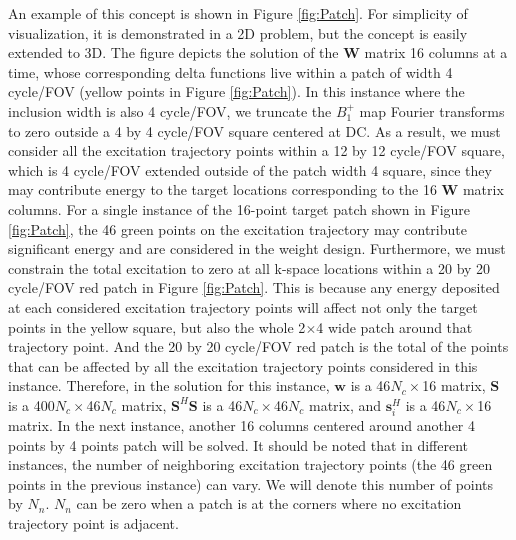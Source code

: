 An example of this concept is shown in Figure \ref{fig:Patch}. For simplicity of visualization, it is demonstrated in a 2D problem, but the concept is easily extended to 3D. The figure depicts the solution of the $\bm{W}$ matrix 16 columns at a time, whose corresponding delta functions live within a patch of width 4 cycle/FOV (yellow points in Figure \ref{fig:Patch}). In this instance where the inclusion width is also 4 cycle/FOV, we truncate the $B_1^+$ map Fourier transforms to zero outside a 4 by 4 cycle/FOV square centered at DC. As a result, we must consider all the excitation trajectory points within a 12 by 12 cycle/FOV square, which is 4 cycle/FOV extended outside of the patch width 4 square, since they may contribute energy to the target locations corresponding to the 16 $\bm{W}$ matrix columns. For a single instance of the 16-point target patch shown in Figure \ref{fig:Patch}, the 46 green points on the excitation trajectory may contribute significant energy and are considered in the weight design. Furthermore, we must constrain the total excitation to zero at all k-space locations within a 20 by 20 cycle/FOV red patch in Figure \ref{fig:Patch}. This is because any energy deposited at each considered excitation trajectory points will affect not only the target points in the yellow square, but also the whole 2$\times$4 wide patch around that trajectory point. And the 20 by 20 cycle/FOV red patch is the total of the points that can be affected by all the excitation trajectory points considered in this instance. Therefore, in the solution for this instance, $\bm{w}$ is a 46$N_c\times$16 matrix, $\bm{S}$ is a 400$N_c\times$46$N_c$ matrix, $\bm{S}^{H}\bm{S}$ is a 46$N_c\times$46$N_c$ matrix, and $\bm{s}_i^{H}$ is a 46$N_c\times$16 matrix. 
In the next instance, another 16 columns centered around another 4 points by 4 points patch will be solved. It should be noted that in different instances, the number of neighboring excitation trajectory points (the 46 green points in the previous instance) can vary. We will denote this number of points by $N_n$. $N_n$ can be zero when a patch is at the corners where no excitation trajectory point is adjacent. 

